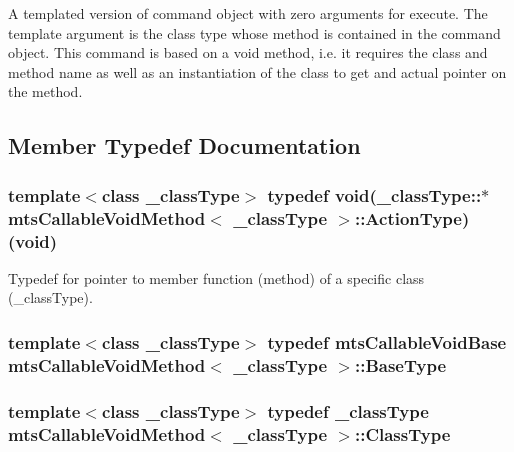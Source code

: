 A templated version of command object with zero arguments for execute. The template argument is the class type whose method is contained in the command object. This command is based on a void method, i.\-e. it requires the class and method name as well as an instantiation of the class to get and actual pointer on the method. 

\subsection{Member Typedef Documentation}
\hypertarget{classmts_callable_void_method_a04f6bc9a458aded32b2419d0fc63da4a}{
\subsubsection[{Action\-Type}]{\setlength{\rightskip}{0pt plus 5cm}template$<$class \-\_\-class\-Type$>$ typedef void(\-\_\-class\-Type\-::$\ast$ {\bf mts\-Callable\-Void\-Method}$<$ \-\_\-class\-Type $>$\-::Action\-Type)(void)}}\label{classmts_callable_void_method_a04f6bc9a458aded32b2419d0fc63da4a}
Typedef for pointer to member function (method) of a specific class (\-\_\-class\-Type). \hypertarget{classmts_callable_void_method_a5afd27bcc6880473f6e89e712a189afc}{
\subsubsection[{Base\-Type}]{\setlength{\rightskip}{0pt plus 5cm}template$<$class \-\_\-class\-Type$>$ typedef {\bf mts\-Callable\-Void\-Base} {\bf mts\-Callable\-Void\-Method}$<$ \-\_\-class\-Type $>$\-::{\bf Base\-Type}}}\label{classmts_callable_void_method_a5afd27bcc6880473f6e89e712a189afc}
\hypertarget{classmts_callable_void_method_a912290d7a57cc13fd33481e16d471467}{
\subsubsection[{Class\-Type}]{\setlength{\rightskip}{0pt plus 5cm}template$<$class \-\_\-class\-Type$>$ typedef \-\_\-class\-Type {\bf mts\-Callable\-Void\-Method}$<$ \-\_\-class\-Type $>$\-::{\bf Class\-Type}}}\label{classmts_callable_void_method_a912290d7a57cc13fd33481e16d471467}
